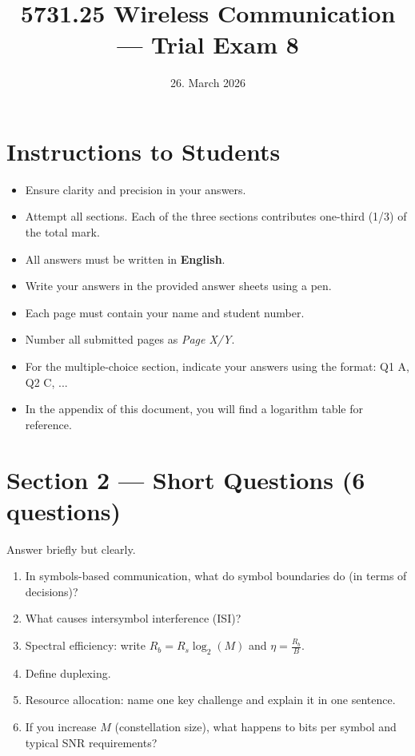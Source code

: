 \documentclass[11pt,a4paper]{article}
\begin{document}
\pagestyle{fancy}
\fancyhf{}
\renewcommand{\headrulewidth}{0pt}
\renewcommand{\footrulewidth}{0pt}
\fancyfoot[R]{\thepage/\pageref{LastPage}}
\fancypagestyle{plain}{
    \fancyhf{}
    \fancyfoot[R]{\thepage/\pageref{LastPage}}
    \renewcommand{\headrulewidth}{0pt}
    \renewcommand{\footrulewidth}{0pt}
}

\title{5731.25 Wireless Communication --- Trial Exam 8}
\date{26. March 2026}
\maketitle

\section*{Instructions to Students}
\begin{itemize}
    \item Ensure clarity and precision in your answers.
    \item Attempt all sections. Each of the three sections contributes one-third (1/3) of the total mark.
    \item All answers must be written in \textbf{English}.
    \item Write your answers in the provided answer sheets using a pen.
    \item Each page must contain your name and student number.
    \item Number all submitted pages as \textit{Page X/Y}.
    \item For the multiple-choice section, indicate your answers using the format: Q1 A, Q2 C, ...
    \item In the appendix of this document, you will find a logarithm table for reference.
\end{itemize}

\newpage

\newpage

\section*{Section 2 --- Short Questions (6 questions)}
Answer briefly but clearly.

\begin{enumerate}[leftmargin=0.9cm]
\item In symbols-based communication, what do symbol boundaries do (in terms of decisions)?

\item What causes intersymbol interference (ISI)?

\item Spectral efficiency: write $R_b = R_s\log_2(M)$ and $\eta = \frac{R_b}{B}$.

\item Define duplexing.

\item Resource allocation: name one key challenge and explain it in one sentence.

\item If you increase $M$ (constellation size), what happens to bits per symbol and typical SNR requirements?
\end{enumerate}
\end{document}

